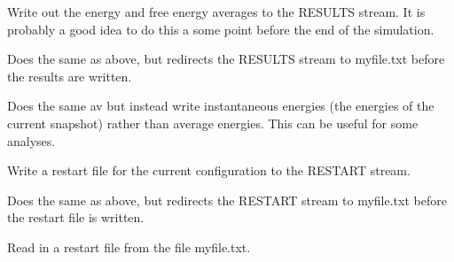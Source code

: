 \documentclass[letterpaper,10pt,english]{sphinxmanual}
\begin{document}
Write out the energy and free energy averages to the RESULTS stream. It is probably a good idea to do this a some point before the end of the simulation.

%
\begin{sphinxVerbatim}[commandchars=\\\{\}]
   
\end{sphinxVerbatim}

Does the same as above, but redirects the RESULTS stream to myfile.txt before the results are written.

%
\begin{sphinxVerbatim}[commandchars=\\\{\}]
   
\end{sphinxVerbatim}

Does the same av  but instead write instantaneous energies (the energies of the current snapshot) rather than average energies. This can be useful for some analyses.

\ignorespaces 
\def\sphinxLiteralBlockLabel{\label{\detokenize{protoms:index-74}}}
%
\begin{sphinxVerbatim}[commandchars=\\\{\}]
  
\end{sphinxVerbatim}

Write a restart file for the current configuration to the RESTART stream.

%
\begin{sphinxVerbatim}[commandchars=\\\{\}]
   
\end{sphinxVerbatim}

Does the same as above, but redirects the RESTART stream to myfile.txt before the restart file is written.

%
\begin{sphinxVerbatim}[commandchars=\\\{\}]
   
\end{sphinxVerbatim}

Read in a restart file from the file myfile.txt.
\end{document}
